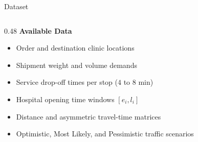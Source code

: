 \documentclass[aspectratio=169,10pt]{beamer}
\begin{document}
\begin{frame}{Dataset}
\begin{columns}[T,totalwidth=\textwidth]
    \begin{column}{0.48\textwidth}
        {\bfseries\color{Primary}\small Available Data}
        \par\vspace{0.06cm}
        \footnotesize
        \begin{itemize}
            \setlength{\itemsep}{1.2pt}
            \item Order and destination clinic locations
            \item Shipment weight and volume demands
            \item Service drop-off times per stop ($4$ to $8\text{ min}$)
            \item Hospital opening time windows $[e_i, l_i]$
            \item Distance and asymmetric travel-time matrices
            \item Optimistic, Most Likely, and Pessimistic traffic scenarios
        \end{itemize}
    \end{column}

\end{columns}

\end{frame}

\end{document}
